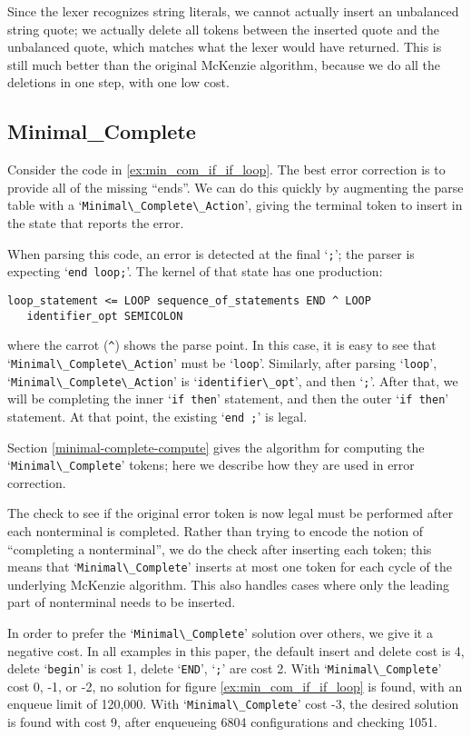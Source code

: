 \documentclass{article}
\newcommand{\code}[1]{`\lstinline|#1|'}
\begin{document}
Since the lexer recognizes string literals, we cannot actually insert
an unbalanced string quote; we actually delete all tokens between the
inserted quote and the unbalanced quote, which matches what the lexer
would have returned. This is still much better than the original
McKenzie algorithm, because we do all the deletions in one step, with
one low cost.

\subsection{Minimal\_Complete}
Consider the code in \ref{ex:min_com_if_if_loop}. The best error
correction is to provide all of the missing ``ends''. We can do this
quickly by augmenting the parse table with a
\code{Minimal\_Complete\_Action}, giving the terminal token to insert in
the state that reports the error.

When parsing this code, an error is detected at the final \code{;};
the parser is expecting \code{end loop;}. The kernel of that state has
one production:
\begin{verbatim}
loop_statement <= LOOP sequence_of_statements END ^ LOOP
   identifier_opt SEMICOLON
\end{verbatim}
where the carrot (\verb|^|) shows the parse point. In this
case, it is easy to see that \code{Minimal\_Complete\_Action} must be
\code{loop}. Similarly, after parsing \code{loop}, \code{Minimal\_Complete\_Action}
is \code{identifier\_opt}, and then \code{;}. After that,
we will be completing the inner \code{if then} statement, and then the
outer \code{if then} statement. At that point, the existing
\code{end ;} is legal.

Section \ref{minimal-complete-compute} gives the algorithm for
computing the \code{Minimal\_Complete} tokens; here we describe how
they are used in error correction.

The check to see if the original error token is now legal must be
performed after each nonterminal is completed. Rather than trying to
encode the notion of ``completing a nonterminal'', we do the check
after inserting each token; this means that \code{Minimal\_Complete}
inserts at most one token for each cycle of the underlying McKenzie
algorithm. This also handles cases where only the leading part of
nonterminal needs to be inserted.

In order to prefer the \code{Minimal\_Complete} solution over others,
we give it a negative cost. In all examples in this paper, the default
insert and delete cost is 4, delete \code{begin} is cost 1, delete
\code{END}, \code{;} are cost 2. With \code{Minimal\_Complete} cost 0,
-1, or -2, no solution for figure \ref{ex:min_com_if_if_loop} is
found, with an enqueue limit of 120,000. With \code{Minimal\_Complete}
cost -3, the desired solution is found with cost 9, after enqueueing
6804 configurations and checking 1051.
\end{document}
